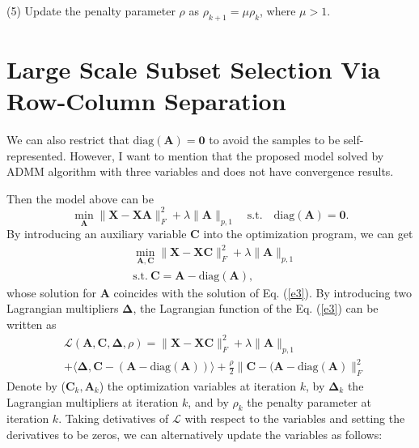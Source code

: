 \documentclass[10pt,twocolumn,letterpaper]{article}
\begin{document}
(5) Update the penalty parameter $\rho$ as $\rho_{k+1}=\mu\rho_{k}$, where $\mu>1$.


\section{Large Scale Subset Selection Via Row-Column Separation}



We can also restrict that $\text{diag}(\bm{A})=\bm{0}$ to avoid the samples to be self-represented. However, I want to mention that the proposed model solved by ADMM algorithm with three variables and does not have convergence results.

Then the model above can be 
\begin{equation}
\label{e2}
\min_{\bm{A}}
\|
\bm{X}
-
\bm{X}\bm{A}
\|_{F}^{2}
+
\lambda
\|
\bm{A}
\|_{p,1}
\quad
\text{s.t.}
\quad
\text{diag}(\bm{A})=\bm{0}.
\end{equation}
By introducing an auxiliary variable $\bm{C}$ into the optimization program, we can get
\begin{equation}
\begin{split}
\label{e3}
&
\min_{\bm{A},\bm{C}}
\|
\bm{X}
-
\bm{X}\bm{C}
\|_{F}^{2}
+
\lambda
\|
\bm{A}
\|_{p,1}
\\
& 
\text{s.t.}
\ 
\bm{C}=\bm{A}-\text{diag}(\bm{A}),
\end{split}
\end{equation}
whose solution for $\bm{A}$ coincides with the solution of Eq. (\ref{e3}). By introducing two Lagrangian multipliers $\bm{\Delta}$, the Lagrangian function of the Eq. (\ref{e3}) can be written as
\begin{equation}
\begin{split}
\label{e5}
&
\mathcal{L}
(\bm{A},\bm{C},\bm{\Delta},\rho)
=
\|
\bm{X}
-
\bm{X}\bm{C}
\|_{F}^{2}
+
\lambda
\|
\bm{A}
\|_{p,1}
\\
&
+
\langle
\bm{\Delta},
\bm{C}-(\bm{A}-\text{diag}(\bm{A}))
\rangle
+
\frac{\rho}{2}
\|
\bm{C}-(\bm{A}-\text{diag}(\bm{A})
\|_{F}^{2}
\end{split}
\end{equation}
Denote by ($\bm{C}_{k},\bm{A}_{k}$) the optimization variables at iteration $k$, by $\bm{\Delta}_{k}$ the Lagrangian multipliers at iteration $k$, and by $\rho_{k}$ the penalty parameter at iteration $k$. Taking detivatives of $\mathcal{L}$ with respect to the variables and setting the derivatives to be zeros, we can alternatively update the variables as follows:
\end{document}
